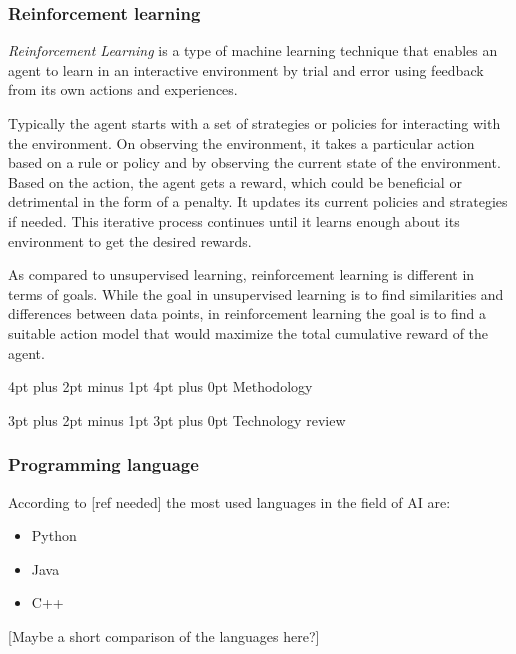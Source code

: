 \documentclass[12pt,a4paper]{article}
\makeatletter
\renewcommand\subsection{\@startsection {subsection}{1}{2mm} %
                                        {3pt plus 2pt minus 1pt} %
                                        {3pt plus 0pt} %
                                        {\normalfont\bfseries}}
\renewcommand\section{\@startsection {section}{1}{0mm} %
                                     {4pt plus 2pt minus 1pt} %
                                     {4pt plus 0pt} %
                                     {\bfseries}}
\makeatother
\begin{document}
\subsubsection{Reinforcement learning}
\textit{Reinforcement Learning} is a type of machine learning technique that enables an agent to learn in an interactive environment by trial and error using feedback from its own actions and experiences.

Typically the agent starts with a set of strategies or policies for interacting with the environment. On observing the environment, it takes a particular action based on a rule or policy and by observing the current state of the environment. Based on the action, the agent gets a reward, which could be beneficial or detrimental in the form of a penalty. It updates its current policies and strategies if needed. This iterative process continues until it learns enough about its environment to get the desired rewards.

As compared to unsupervised learning, reinforcement learning is different in terms of goals. While the goal in unsupervised learning is to find similarities and differences between data points, in reinforcement learning the goal is to find a suitable action model that would maximize the total cumulative reward of the agent.

\newpage
\section{Methodology}

\subsection{Technology review}
\subsubsection{Programming language}
According to [ref needed] the most used languages in the field of AI are:
\begin{itemize}
    \item Python
    \item Java
    \item C++
\end{itemize}

[Maybe a short comparison of the languages here?]
\end{document}
